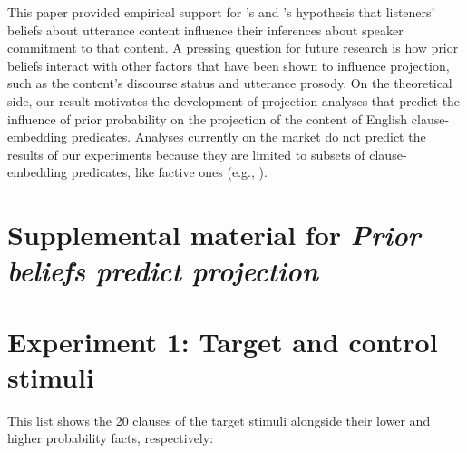 \documentclass[11pt,fleqn]{article}
\newcommand{\6}{\mbox{$[\hspace*{-.6mm}[$}}
\newcommand{\9}{\mbox{$]\hspace*{-.6mm}]$}}
\newcommand{\citetpos}[1]{\citeauthor{#1}'s \citeyear{#1}}
\begin{document}
This paper provided empirical support for \citetpos{stevens-etal2017} and \citetpos{tbd-variability} hypothesis that listeners' beliefs about utterance content influence their inferences about speaker commitment to that content. A pressing question for future research is how prior beliefs interact with other factors that have been shown to influence projection, such as the content's discourse status and utterance prosody. On the theoretical side, our result motivates the development of projection analyses that predict the influence of prior probability on the projection of the content of English clause-embedding predicates. Analyses currently on the market do not predict the results of our experiments  because they are limited to subsets of clause-embedding predicates, like factive ones (e.g., ).



%

%
%


\newpage

\appendix

\setcounter{table}{0}
\renewcommand{\thetable}{A\arabic{table}}

\setcounter{figure}{0}
\renewcommand{\thefigure}{A\arabic{figure}}

\section*{Supplemental material for {\em Prior beliefs predict projection}}

\section{Experiment 1: Target and control stimuli}\label{a-stim}

This list shows the 20 clauses of the target stimuli alongside their lower and higher probability facts, respectively:
\end{document}
